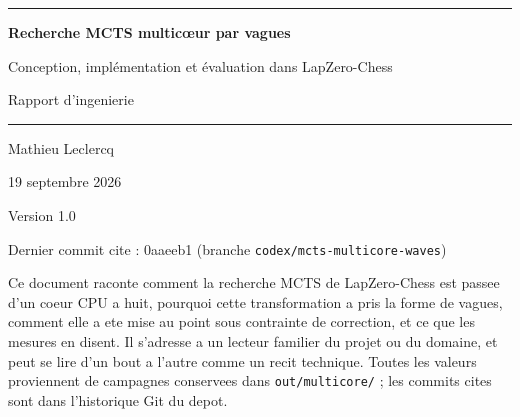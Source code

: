 \documentclass[11pt,a4paper]{article}
\newcommand{\code}[1]{\texttt{\small #1}}
\newcommand{\docTitre}{Recherche MCTS multic\oe{}ur par vagues}
\newcommand{\docSousTitre}{Conception, impl\'ementation et \'evaluation dans
LapZero-Chess}
\newcommand{\docAuteur}{Mathieu Leclercq}
\newcommand{\docDate}{19 septembre 2026}
\newcommand{\docVersion}{Version 1.0}
\newcommand{\docCommit}{0aaeeb1 (branche
\code{codex/mcts-multicore-waves})}
\begin{document}
\begin{titlepage}
\centering
\vspace*{1.5cm}
{\color{bleu}\rule{\textwidth}{1.2pt}}
\vspace{0.8cm}

{\Huge\bfseries\color{bleu} \docTitre\par}
\vspace{0.5cm}
{\Large\color{gris} \docSousTitre\par}

\vspace{0.6cm}
{\large Rapport d'ingenierie\par}

\vspace{0.4cm}
{\color{bleu}\rule{\textwidth}{0.6pt}}
\vspace{1.2cm}

{\large \docAuteur\par}
{\large \docDate\par}
\vspace{0.3cm}
{\small \docVersion\par}
{\small Dernier commit cite : \docCommit\par}

\vfill

\begin{tcolorbox}[enhanced, colback=grisfond, colframe=gris!50,
  boxrule=0.5pt, arc=2pt, width=0.88\textwidth]
\small
Ce document raconte comment la recherche MCTS de LapZero-Chess est passee
d'un coeur CPU a huit, pourquoi cette transformation a pris la forme de
vagues, comment elle a ete mise au point sous contrainte de correction, et
ce que les mesures en disent. Il s'adresse a un lecteur familier du projet
ou du domaine, et peut se lire d'un bout a l'autre comme un recit technique.
Toutes les valeurs proviennent de campagnes conservees dans
\code{out/multicore/} ; les commits cites sont dans l'historique Git du
depot.
\end{tcolorbox}
\vspace{1cm}
\end{titlepage}

\tableofcontents
\newpage










\end{document}
